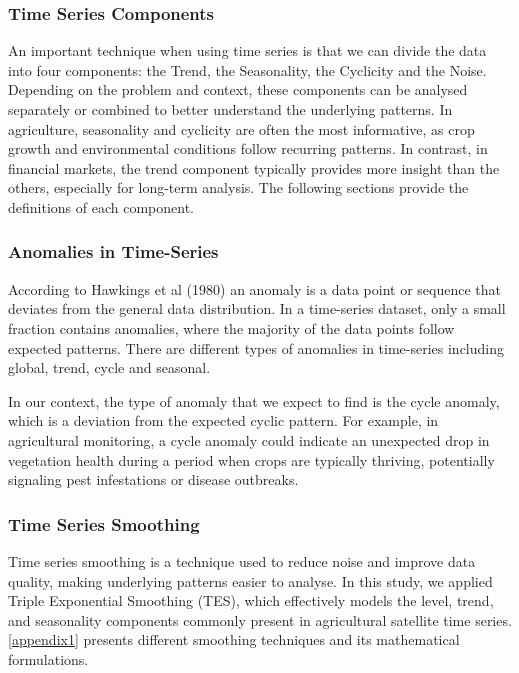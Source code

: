 \documentclass{article} %
\begin{document}
        \subsubsection{Time Series Components}
        An important technique when using time series is that we can divide the data into four components: the Trend, the Seasonality, the Cyclicity and the Noise. Depending on the problem and context, these components can be analysed separately or combined to better understand the underlying patterns. In agriculture, seasonality and cyclicity are often the most informative, as crop growth and environmental conditions follow recurring patterns. In contrast, in financial markets, the trend component typically provides more insight than the others, especially for long-term analysis. The following sections provide the definitions of each component.

        \subsubsection{Anomalies in Time-Series}
            According to Hawkings et al (1980) an anomaly is a data point or sequence that deviates from the general data distribution. In a time-series dataset, only a small fraction contains anomalies, where the majority of the data points follow expected patterns. There are different types of anomalies in time-series including global, trend, cycle and seasonal.

            In our context, the type of anomaly that we expect to find is the cycle anomaly, which is a deviation from the expected cyclic pattern. For example, in agricultural monitoring, a cycle anomaly could indicate an unexpected drop in vegetation health during a period when crops are typically thriving, potentially signaling pest infestations or disease outbreaks.
        
        \subsubsection{Time Series Smoothing}
        Time series smoothing is a technique used to reduce noise and improve data quality, making underlying patterns easier to analyse. In this study, we applied Triple Exponential Smoothing (TES), which effectively models the level, trend, and seasonality components commonly present in agricultural satellite time series. \ref{appendix1} presents different smoothing techniques and its mathematical formulations.
\end{document}
